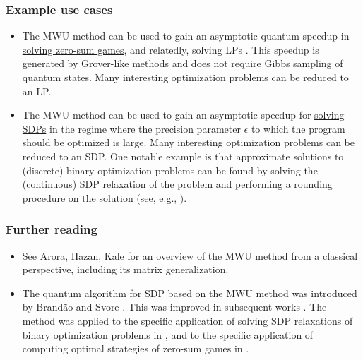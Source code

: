 \begin{refsection}

\subsubsection*{Example use cases}

\begin{itemize}
    \item The MWU method can be used to gain an asymptotic quantum speedup in 
    \hyperref[appl:ZeroSumGames]{solving zero-sum games}, and relatedly, solving LPs \cite{apeldoorn2019QAlgorithmsForZeroSumGames}. This speedup is generated by Grover-like methods and does not require Gibbs sampling of quantum states.  Many interesting optimization problems can be reduced to an LP. 
    
    \item The MWU method can be used to gain an asymptotic speedup for \hyperref[appl:ConicProgramming]{solving SDPs} in the regime where the precision parameter $\epsilon$ to which the program should be optimized is large. Many interesting optimization problems can be reduced to an SDP. One notable example is that approximate solutions to (discrete) binary optimization problems can be found by solving the (continuous) SDP relaxation of the problem and performing a rounding procedure on the solution (see, e.g., \cite{brandao2022fasterQuantum}). 
\end{itemize}


\subsubsection*{Further reading}

\begin{itemize}
    \item See Arora, Hazan, Kale \cite{arora2012MultiplicativeWeightsAlg} for an overview of the MWU method from a classical perspective, including its matrix generalization. 
    \item The quantum algorithm for SDP based on the MWU method was introduced by Brand\~ao and Svore \cite{brandao2016QSDPSpeedup}. This was improved in subsequent works \cite{brandao2017QSDPSpeedupsLearning,apeldoorn2017QSDPSolvers,apeldoorn2018ImprovedQSDPSolving}. The method was applied to the specific application of solving SDP relaxations of binary optimization problems in \cite{brandao2022fasterQuantum, augustino2023solvingQUBO}, and to the specific application of computing optimal strategies of zero-sum games in \cite{apeldoorn2019QAlgorithmsForZeroSumGames}.
\end{itemize}


\printbibliography[heading=secbib,segment=\therefsegment]

\end{refsection}
